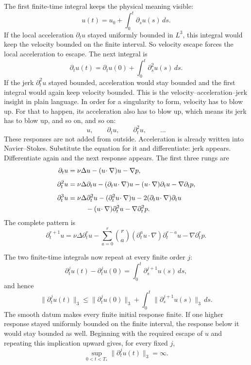 The first finite-time integral keeps the physical meaning visible:
\[
u(t)=u_0+\int_0^t\partial_su(s)\,ds.
\]
If the local acceleration \(\partial_tu\) stayed uniformly bounded in
\(L^3\), this integral would keep the velocity bounded on the finite interval.
So velocity escape forces the local acceleration to escape.  The next integral
is
\[
\partial_tu(t)
=\partial_tu(0)+\int_0^t\partial_s^2u(s)\,ds.
\]
If the jerk \(\partial_t^2u\) stayed bounded, acceleration would stay bounded
and the first integral would again keep velocity bounded.  This is the
velocity--acceleration--jerk insight in plain language.  In order for a
singularity to form, velocity has to blow up.  For that to happen, its
acceleration also has to blow up, which means its jerk has to blow up, and so
on, and so on:
\[
u,\qquad \partial_tu,\qquad \partial_t^2u,\qquad\ldots
\]
These responses are not added from outside.  Acceleration is already written
into Navier--Stokes.  Substitute the equation for it and differentiate: jerk
appears.  Differentiate again and the next response appears.  The first three
rungs are
\[
\begin{aligned}
\partial_tu
&=\nu\Delta u-(u\!\cdot\nabla)u-\nabla p,\\[4pt]
\partial_t^2u
&=\nu\Delta\partial_tu
  -(\partial_tu\!\cdot\nabla)u
  -(u\!\cdot\nabla)\partial_tu
  -\nabla\partial_tp,\\[4pt]
\partial_t^3u
&=\nu\Delta\partial_t^2u
  -(\partial_t^2u\!\cdot\nabla)u
  -2(\partial_tu\!\cdot\nabla)\partial_tu\\
&\hspace{2.6em}
  -(u\!\cdot\nabla)\partial_t^2u
  -\nabla\partial_t^2p.
\end{aligned}
\]
The complete pattern is
\[
\partial_t^{r+1}u
=\nu\Delta\partial_t^ru
-\sum_{a=0}^{r}\binom ra
  (\partial_t^au\!\cdot\nabla)\partial_t^{r-a}u
-\nabla\partial_t^rp.
\]

The two finite-time integrals now repeat at every finite order \(j\):
\[
\partial_t^ju(t)-\partial_t^ju(0)
=\int_0^t\partial_s^{j+1}u(s)\,ds,
\]
and hence
\[
\|\partial_t^ju(t)\|_3
\leq \|\partial_t^ju(0)\|_3
  +\int_0^t\|\partial_s^{j+1}u(s)\|_3\,ds.
\]
The smooth datum makes every finite initial response finite.  If one higher
response stayed uniformly bounded on the finite interval, the response below
it would stay bounded as well.  Beginning with the required escape of \(u\)
and repeating this implication upward gives, for every fixed \(j\),
\[
\sup_{0<t<T_*}\|\partial_t^ju(t)\|_3=\infty.
\]

